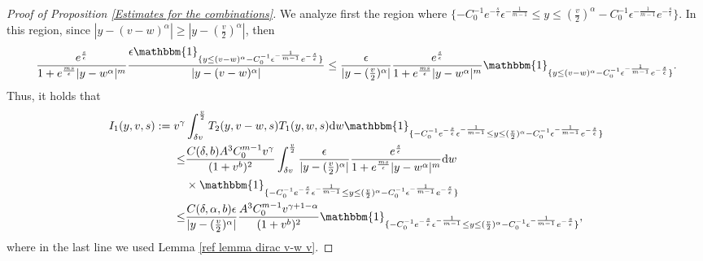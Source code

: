 \documentclass[11pt]{article}
\numberwithin{equation}{section}
\newcommand{\der}{\textup{d}}
\begin{document}
\begin{proof}[Proof of Proposition \ref{Estimates for the combinations}]
 
 We analyze first the region where $\{-C_{0}^{-1}e^{-\frac{s}{\epsilon}}\epsilon^{-\frac{1}{m-1}}\leq y\leq (\frac{v}{2})^{\alpha}-C_{0}^{-1}\epsilon^{-\frac{1}{m-1}}e^{-\frac{s}{\epsilon}}\}$. In this region, since $|y-(v-w)^{\alpha}|\geq |y-(\frac{v}{2})^{\alpha}|$, then 
\begin{align*}
   \frac{e^{\frac{s}{\epsilon}}}{1+e^{\frac{ms}{\epsilon}}|y-w^{\alpha}|^{m}}\frac{\epsilon\mathbbm{1}_{\{y\leq (v-w)^{\alpha}-C_{0}^{-1}\epsilon^{-\frac{1}{m-1}}e^{-\frac{s}{\epsilon}}\}}}{|y-(v-w)^{\alpha}|}\leq  \frac{\epsilon}{|y-(\frac{v}{2})^{\alpha}|}  \frac{e^{\frac{s}{\epsilon}}}{1+e^{\frac{ms}{\epsilon}}|y-w^{\alpha}|^{m}}\mathbbm{1}_{\{y\leq (v-w)^{\alpha}-C_{0}^{-1}\epsilon^{-\frac{1}{m-1}}e^{-\frac{s}{\epsilon}}\}}.
\end{align*}Thus, it holds that
\begin{align*}
   I_{1}(y,v,s):= v^{\gamma} &\int_{\delta v}^{\frac{v}{2}} T_{2}(y,v-w,s)T_{1}(y,w,s)\der w\mathbbm{1}_{\{-C_{0}^{-1}e^{-\frac{s}{\epsilon}}\epsilon^{-\frac{1}{m-1}}\leq y\leq (\frac{v}{2})^{\alpha}-C_{0}^{-1}\epsilon^{-\frac{1}{m-1}}e^{-\frac{s}{\epsilon}}\}}\\
       \leq& \frac{C(\delta, b) A^{3}C_{0}^{m-1}v^{\gamma}}{(1+v^{b})^{2}}\int_{\delta v}^{\frac{v}{2}}\frac{\epsilon}{|y-(\frac{v}{2})^{\alpha}|}  \frac{e^{\frac{s}{\epsilon}}}{1+e^{\frac{ms}{\epsilon}}|y-w^{\alpha}|^{m}}\der w\\
  &  \times \mathbbm{1}_{\{-C_{0}^{-1}e^{-\frac{s}{\epsilon}}\epsilon^{-\frac{1}{m-1}}\leq y\leq (\frac{v}{2})^{\alpha}-C_{0}^{-1}\epsilon^{-\frac{1}{m-1}}e^{-\frac{s}{\epsilon}}\}}\\
 \leq &\frac{C(\delta, \alpha,b)\epsilon}{|y-(\frac{v}{2})^{\alpha}|} \frac{A^{3}C_{0}^{m-1} v^{\gamma+1-\alpha}}{(1+v^{b})^{2}}\mathbbm{1}_{\{-C_{0}^{-1}e^{-\frac{s}{\epsilon}}\epsilon^{-\frac{1}{m-1}}\leq y\leq (\frac{v}{2})^{\alpha}-C_{0}^{-1}\epsilon^{-\frac{1}{m-1}}e^{-\frac{s}{\epsilon}}\}},
\end{align*}
where in the last line we used Lemma \ref{ref lemma dirac v-w v}.
 

\end{proof}
\end{document}

